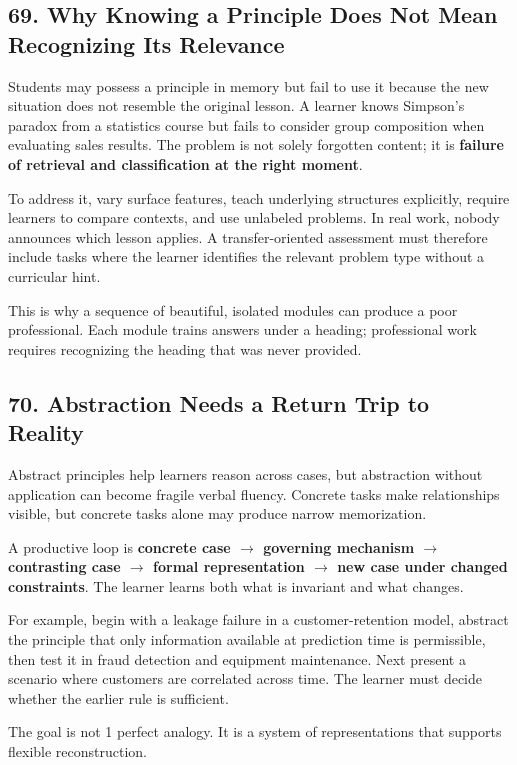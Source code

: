 \subsection*{69. Why Knowing a Principle Does Not Mean Recognizing Its Relevance}

Students may possess a principle in memory but fail to use it because the new situation does not resemble the original lesson. A learner knows Simpson's paradox from a statistics course but fails to consider group composition when evaluating sales results. The problem is not solely forgotten content; it is \textbf{failure of retrieval and classification at the right moment}.

To address it, vary surface features, teach underlying structures explicitly, require learners to compare contexts, and use unlabeled problems. In real work, nobody announces which lesson applies. A transfer-oriented assessment must therefore include tasks where the learner identifies the relevant problem type without a curricular hint.

This is why a sequence of beautiful, isolated modules can produce a poor professional. Each module trains answers under a heading; professional work requires recognizing the heading that was never provided.

\subsection*{70. Abstraction Needs a Return Trip to Reality}

Abstract principles help learners reason across cases, but abstraction without application can become fragile verbal fluency. Concrete tasks make relationships visible, but concrete tasks alone may produce narrow memorization.

A productive loop is \textbf{concrete case $\to$ governing mechanism $\to$ contrasting case $\to$ formal representation $\to$ new case under changed constraints}. The learner learns both what is invariant and what changes.

For example, begin with a leakage failure in a customer-retention model, abstract the principle that only information available at prediction time is permissible, then test it in fraud detection and equipment maintenance. Next present a scenario where customers are correlated across time. The learner must decide whether the earlier rule is sufficient.

The goal is not 1 perfect analogy. It is a system of representations that supports flexible reconstruction.
